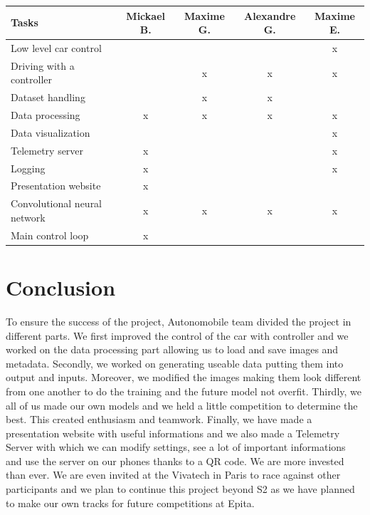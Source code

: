 \documentclass[12pt]{article}
\begin{document}
\begin{tabular}{|l|c|c|c|c|} 
\hline
Tasks                        & Mickael B. & Maxime G. & Alexandre G. & Maxime E.  \\ 
\hline
Low level car control        &            &           &              & x          \\ 
\hline
Driving with a controller    &            & x         & x            & x          \\ 
\hline
Dataset handling             &            & x         & x            &            \\ 
\hline
Data processing              & x          & x         & x            & x          \\ 
\hline
Data visualization           &            &           &              & x          \\ 
\hline
Telemetry server             & x          &           &              & x          \\ 
\hline
Logging                      & x          &           &              & x          \\ 
\hline
Presentation website         & x          &           &              &            \\ 
\hline
Convolutional neural network & x          & x         & x            & x          \\ 
\hline
Main control loop            & x          &           &              &            \\
\hline
\end{tabular}

\section {Conclusion}
 To ensure the success of the project, Autonomobile team divided the project in different parts. We first improved the control of the car with controller and we worked on the data processing part allowing us to load and save images and metadata. Secondly, we worked on generating useable data putting them into output and inputs. Moreover, we modified the images making them look different from one another to do the training and the future model not overfit. Thirdly, we all of us made our own models and we held a little competition to determine the best. This created enthusiasm and teamwork. Finally, we have made a presentation website with useful informations and we also made a Telemetry Server with which we can modify settings, see a lot of important informations and use the server on our phones thanks to a QR code. We are more invested than ever. We are even invited at the Vivatech in Paris to race against other participants and we plan to continue this project beyond S2 as we have planned to make our own tracks for future competitions at Epita.
\end{document}

